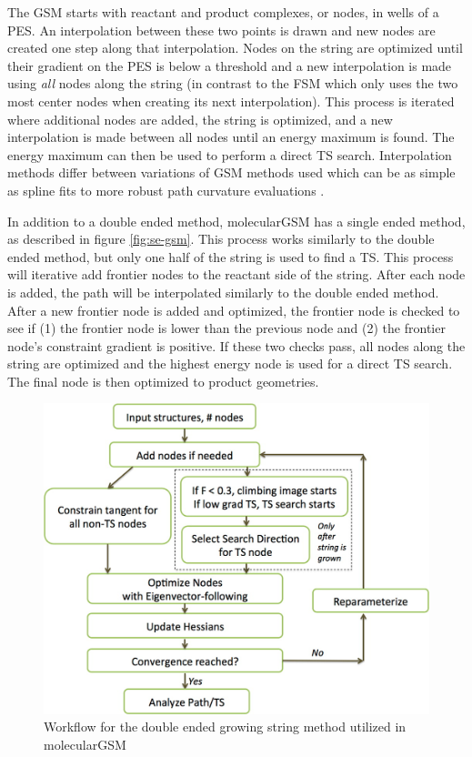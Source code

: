 \documentclass[preprint, 11pt]{elsarticle} %
\begin{document}
The GSM starts with reactant and product complexes, or nodes, in wells of a PES.
An interpolation between these two points is drawn and new nodes are created one step along that interpolation. 
Nodes on the string are optimized  until their gradient on the PES is below a threshold and a new interpolation is made using \textit{all} nodes along the string (in contrast to the FSM which only uses the two most center nodes when creating its next interpolation).
This process is iterated where additional nodes are added, the string is optimized, and a new interpolation is made between all nodes until an energy maximum is found. 
The energy maximum can then be used to perform a direct TS search.
Interpolation methods differ between variations of GSM methods used which can be as simple as spline fits to more robust path curvature evaluations .

In addition to a double ended method, molecularGSM has a single ended method, as described in figure \ref{fig:se-gsm}.
This process works similarly to the double ended method, but only one half of the string is used to find a TS.
This process will iterative add frontier nodes to the reactant side of the string.
After each node is added, the path will be interpolated similarly to the double ended method.
After a new frontier node is added and optimized, the frontier node is checked to see if (1) the frontier node is lower than the previous node and (2) the frontier node's constraint gradient is positive. 
If these two checks pass, all nodes along the string are optimized and the highest energy node is used for a direct TS search.
The final node is then optimized to product geometries.


\begin{figure}
    \centering
    \includegraphics[width=5in]{gsm}
    \caption{Workflow for the double ended growing string method utilized in molecularGSM \cite{}}
    \label{fig:gsm}
\end{figure}
\end{document}

